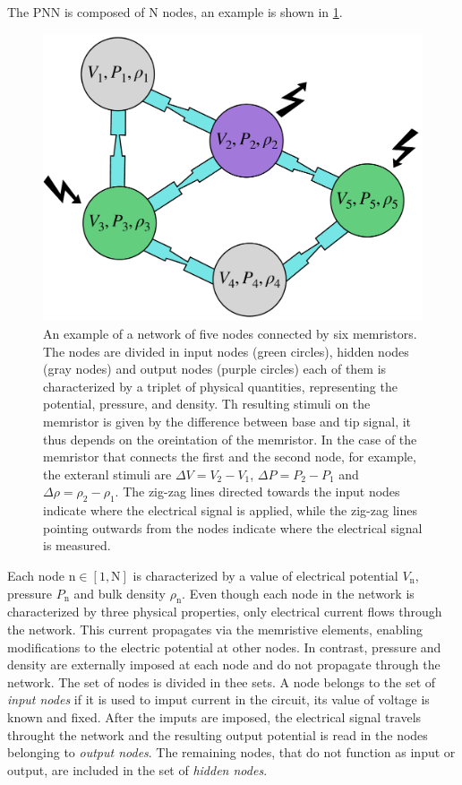 \documentclass[reprint,superscriptaddress,prb,showkeys]{revtex4-2}
\newcommand{\N}{\text{N}} %
\newcommand{\n}{\text{n}} %
\begin{document}
The PNN is composed of $\N$ nodes, an example is shown in \cref{fig:memristor_network}. 
\begin{figure}[h]
    \centering
    \includegraphics[width=0.8\columnwidth]{plots/memristor/memristor_network.pdf}
    \caption{An example of a network of five nodes connected by six memristors. The nodes are divided in input nodes (green circles), hidden nodes (gray nodes) and output nodes (purple circles) each of them is characterized by a triplet of physical quantities, representing the potential, pressure, and density. Th resulting stimuli on the memristor is given by the difference between base and tip signal, it thus depends on the oreintation of the memristor. In the case of the memristor that connects the first and the second node, for example, the exteranl stimuli are $\Delta V = V_2 - V_1$, $\Delta P = P_2 - P_1$ and $\Delta \rho = \rho_2 - \rho_1$. The zig-zag lines directed towards the input nodes indicate where the electrical signal is applied, while the zig-zag lines pointing outwards from the nodes indicate where the electrical signal is measured.}
    \label{fig:memristor_network}
\end{figure} 
Each node $\n\in[1,\N]$ is characterized by a value of electrical potential $V_{\n}$, pressure $P_{\n}$ and bulk density $\rho_{\n}$. Even though each node in the network is characterized by three physical properties, only electrical current flows through the network. This current propagates via the memristive elements, enabling modifications to the electric potential at other nodes. In contrast, pressure and density are externally imposed at each node and do not propagate through the network. The set of nodes is divided in thee sets. A node belongs to the set of \textit{input nodes} if it is used to imput current in the circuit, its value of voltage is known and fixed. After the imputs are imposed, the electrical signal travels throught the network and the resulting output potential is read in the nodes belonging to \textit{output nodes}. The remaining nodes, that do not function as input or output, are included in the set of \textit{hidden nodes}.
\end{document}
